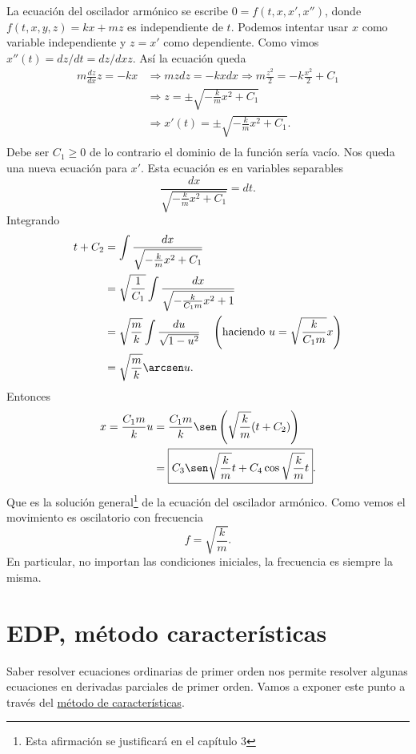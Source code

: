 La ecuación del oscilador armónico se escribe $0=f(t,x,x',x'')$, donde \linebreak $f(t,x,y,z)=kx+mz$ es independiente de $t$. Podemos intentar usar $x$ como variable
independiente y $z=x'$ como dependiente. Como vimos  $x''(t)=dz/dt=dz/dx z$. Así la ecuación queda
\[\begin{split}
   m\frac{dz}{dx}z=-kx &\Longrightarrow mzdz=-kxdx\Longrightarrow m\frac{z^2}{2}=-k\frac{x^2}{2}+C_1\\
   &\Longrightarrow z=\pm\sqrt{-\frac{k}{m}x^2+C_1}\\
   &\Longrightarrow x'(t)=\pm\sqrt{-\frac{k}{m}x^2+C_1}.\\
  \end{split}
\]
Debe ser $C_1\geq 0$ de lo contrario el dominio de la función sería vacío. Nos queda una nueva ecuación para $x'$.
Esta ecuación es en variables separables
\[ \frac{dx}{\sqrt{-\frac{k}{m}x^2+C_1}}=dt.
\]
 Integrando
\[\begin{split}
   t+C_2
   &=\int \frac{dx}{\sqrt{-\frac{k}{m}x^2+C_1}}\\
   &= \sqrt{\frac{1}{C_1}} \int \frac{dx}{\sqrt{-\frac{k}{C_1m}x^2+1}} \\
   &= \sqrt{\frac{m}{k}} \int \frac{du}{\sqrt{1-u^2}}\quad \left(\text{haciendo } u=\sqrt{\frac{k}{C_1m}}x\right)\\
   &=\sqrt{\frac{m}{k}}\arcsen u.
  \end{split}
\]
Entonces
\[\begin{split}
    x=\frac{C_1m}{k}u &=\frac{C_1m}{k}\sen \left(\sqrt{\frac{k}{m}}(t+C_2)\right)\\
    &=\boxed{C_3\sen \sqrt{\frac{k}{m}}t+C_4\cos \sqrt{\frac{k}{m}}t}.
  \end{split}
 \]
Que es la solución general\footnote{Esta afirmación se justificará en el capítulo 3}  de la ecuación del oscilador armónico. Como vemos el movimiento es oscilatorio con frecuencia
\[\boxed{f=\sqrt{\frac{k}{m}} }.\]
En particular, no importan las condiciones iniciales, la frecuencia es siempre la misma.






\section{EDP, método características}

Saber resolver ecuaciones ordinarias de primer orden nos permite resolver algunas ecuaciones en derivadas parciales de primer orden.  Vamos a exponer este punto a través del \href{https://en.wikipedia.org/wiki/Method_of_characteristics}{método de características}\link.

